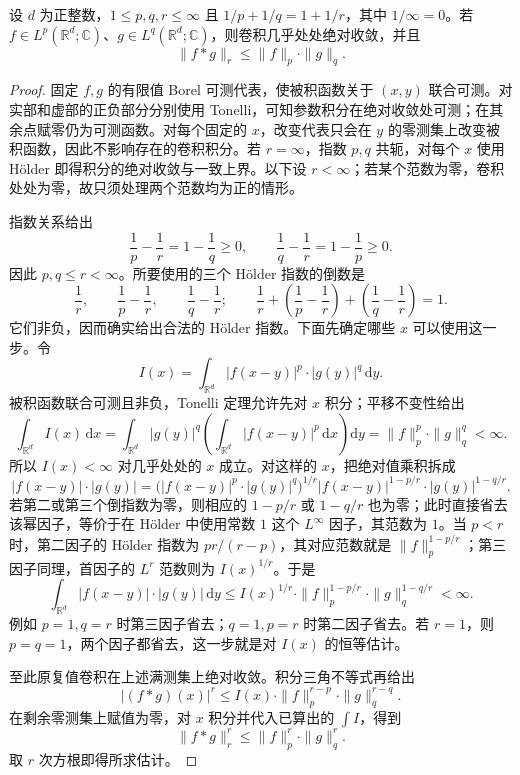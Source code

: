 \begin{theorem}\label{b2:thm:03-young}
设 \(d\) 为正整数，\(1\leq p,q,r\leq\infty\) 且 \(1/p+1/q=1+1/r\)，其中 \(1/\infty=0\)。若 \(f\in L^p(\mathbb R^d;\mathbb C)\)、\(g\in L^q(\mathbb R^d;\mathbb C)\)，则卷积几乎处处绝对收敛，并且
\[
 \|f*g\|_r\leq\|f\|_p\cdot\|g\|_q.
\]
\end{theorem}
\begin{proof}
固定 \(f,g\) 的有限值 Borel 可测代表，使被积函数关于 \((x,y)\) 联合可测。对实部和虚部的正负部分分别使用 Tonelli，可知参数积分在绝对收敛处可测；在其余点赋零仍为可测函数。对每个固定的 \(x\)，改变代表只会在 \(y\) 的零测集上改变被积函数，因此不影响存在的卷积积分。若 \(r=\infty\)，指数 \(p,q\) 共轭，对每个 \(x\) 使用 Hölder 即得积分的绝对收敛与一致上界。以下设 \(r<\infty\)；若某个范数为零，卷积处处为零，故只须处理两个范数均为正的情形。

指数关系给出
\[
 \frac1p-\frac1r=1-\frac1q\geq0,
 \qquad
 \frac1q-\frac1r=1-\frac1p\geq0.
\]
因此 \(p,q\leq r<\infty\)。所要使用的三个 Hölder 指数的倒数是
\[
 \frac1r,\qquad \frac1p-\frac1r,\qquad \frac1q-\frac1r;
 \qquad
 \frac1r+\left(\frac1p-\frac1r\right)
             +\left(\frac1q-\frac1r\right)=1.
\]
它们非负，因而确实给出合法的 Hölder 指数。下面先确定哪些 \(x\) 可以使用这一步。令
\[
 I(x)=\int_{\mathbb R^d}|f(x-y)|^p\cdot|g(y)|^q\,\mathrm dy.
\]
被积函数联合可测且非负，Tonelli 定理允许先对 \(x\) 积分；平移不变性给出
\[
 \int_{\mathbb R^d}I(x)\,\mathrm dx
 =\int_{\mathbb R^d}|g(y)|^q
    \left(\int_{\mathbb R^d}|f(x-y)|^p\,\mathrm dx\right)\mathrm dy
 =\|f\|_p^p\cdot\|g\|_q^q<\infty.
\]
所以 \(I(x)<\infty\) 对几乎处处的 \(x\) 成立。对这样的 \(x\)，把绝对值乘积拆成
\[
 |f(x-y)|\cdot|g(y)|
 =\bigl(|f(x-y)|^p\cdot|g(y)|^q\bigr)^{1/r}
    |f(x-y)|^{1-p/r}\cdot|g(y)|^{1-q/r}.
\]
若第二或第三个倒指数为零，则相应的 \(1-p/r\) 或 \(1-q/r\) 也为零；此时直接省去该幂因子，等价于在 Hölder 中使用常数 \(1\) 这个 \(L^\infty\) 因子，其范数为 \(1\)。当 \(p<r\) 时，第二因子的 Hölder 指数为 \(pr/(r-p)\)，其对应范数就是 \(\|f\|_p^{1-p/r}\)；第三因子同理，首因子的 \(L^r\) 范数则为 \(I(x)^{1/r}\)。于是
\[
 \int_{\mathbb R^d}|f(x-y)|\cdot|g(y)|\,\mathrm dy
 \leq I(x)^{1/r}\cdot\|f\|_p^{1-p/r}\cdot\|g\|_q^{1-q/r}<\infty.
\]
例如 \(p=1,q=r\) 时第三因子省去；\(q=1,p=r\) 时第二因子省去。若 \(r=1\)，则 \(p=q=1\)，两个因子都省去，这一步就是对 \(I(x)\) 的恒等估计。

至此原复值卷积在上述满测集上绝对收敛。积分三角不等式再给出
\[
 |(f*g)(x)|^r
 \leq I(x)\cdot\|f\|_p^{r-p}\cdot\|g\|_q^{r-q}.
\]
在剩余零测集上赋值为零，对 \(x\) 积分并代入已算出的 \(\int I\)，得到
\[
 \|f*g\|_r^r\leq\|f\|_p^r\cdot\|g\|_q^r.
\]
取 \(r\) 次方根即得所求估计。
\end{proof}

